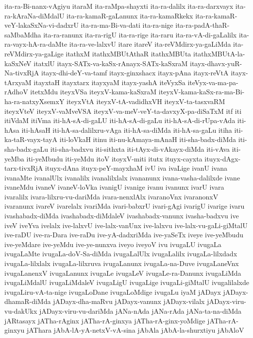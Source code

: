 {ita-ra-Bi-nanx-vAgiyu
itaraM
ita-raMpa-shayxti
ita-ra-dalilx
ita-ra-darxvayx
ita-ra-kAraNa-diMdalU
ita-ra-kamaR-gaLanunx
ita-ra-kamaRkekx
ita-ra-kamaR-veY-lakaSxNa-vi-dadxrU
ita-ra-ma-Bi-va-dati
ita-ra-nige
ita-ra-padA-thaR-saMbaMdha
ita-ra-ranunx
ita-ra-rigU
ita-ra-rige
ita-raru
ita-ra-vA-di-gaLalilx
ita-ra-vayx-hA-ra-daMte
ita-ra-ve-lalxvU
itare
itareV
ita-reVMdirx-ya-gaLiMda
ita-reVMdirx-ya-gaLige
itathxM
itathxMBUtAthaR
itathxMBUta
itathxMBUtA-la-kaSxNeV
itatxlU
itayx-SATx-va-kaSx-rAnayx-SATx-kaSxraM
itayx-dhavx-yuR-Na-tivxRjA
itayx-dhi-deY-va-tamf
itayx-ginxshacx
itayx-pAna
itayx-reVtA
itayx-tArxyaM
itayxtaH
itayxtarx
itayxyaM
itayx-yashA
iteVyxSa
iteVyx-va-ma-pa-rAdhoV
itetxMdu
iteyxVSa
iteyxV-kama-kaSxraM
iteyxV-kama-kaSx-ra-ma-Bi-ha-ra-natxyXsemxY
iteyxVtA
iteyxV-tA-vadidhxVH
iteyxV-ta-tasxvaRM
iteyxVteV
iteyxV-vaMveVSA
iteyxV-va-meV-veY-ta-davxyX-pa-diSaTxM
itf
iti
itiVdaM
itiVma
iti-hA-sA-di-gaLU
iti-hA-sA-di-gaLu
iti-hA-sA-di-rUpa-vAda
iti-hAsa
iti-hAsaH
iti-hA-sa-dalilxru-vAga
iti-hA-sa-diMda
iti-hA-sa-gaLu
itiha
iti-ka-taR-vayx-tayA
iti-loVkaH
itinu
iti-nu-kAmaya-mAnaH
iti-sha-badx-diMda
iti-sha-badx-gaLu
iti-sha-badxvu
iti-sithxta
iti-tAyx-di-vAkayx-diMda
iti-vAva
iti-yeMba
iti-yeMbudu
iti-yeMdu
itoV
itoyxV-miti
itutx
ituyx-cayxta
ituyx-dAgx-tarx-tivxRjA
ituyx-dAna
ituyx-peY-mayxhaM
ivU
iva
ivaLige
ivanU
ivana
ivanaMte
ivanalUlx
ivanalilx
ivanalilxlalx
ivananunx
ivana-vasha-dalilxde
ivane
ivaneMdu
ivaneV
ivaneV-loVka
ivanigU
ivanige
ivanu
ivanunx
ivarU
ivara
ivaralilx
ivara-lilxru-vu-dariMda
ivara-nenxlAlx
ivaranoVnx
ivaranonxV
ivaranunx
ivareV
ivarelalx
ivariMda
ivari-babxrU
ivari-gAgi
ivarigU
ivarige
ivaru
ivashabadx-diMda
ivashabadx-diMdaleV
ivashabadx-vanunx
ivasha-badxvu
ive
iveV
iveYva
ivelalx
ive-lalxvU
ive-lalx-vanUnx
ive-lalxvu
ive-lalx-vu-gaLi-giMtalU
ive-raDU
ive-ra-Dara
ive-raDu
ive-yA-dadxriMda
ive-yaSeTx
iveye
ive-yeMbudu
ive-yeMdare
ive-yeMdu
ive-ye-nunxva
iveyo
iveyoV
ivu
ivugaLU
ivugaLa
ivugaLaMte
ivugaLa-doV-Sa-diMda
ivugaLalUlx
ivugaLalilx
ivugaLa-lilxdadx
ivugaLa-lilxlalx
ivugaLa-lilxruva
ivugaLanunx
ivugaLa-na-Duve
ivugaLaneVnx
ivugaLanenxV
ivugaLanunx
ivugaLe
ivugaLeV
ivugaLe-ra-Danunx
ivugaLiMda
ivugaLiMdalU
ivugaLiMdaleV
ivugaLigU
ivugaLige
ivugaLi-giMtalU
ivugalilalxde
ivugaLiru-vA-ta-nige
ivugaLoDane
ivugaLoMdige
ivugaLu
iyaM
jADayx
jADayx-dhamaR-diMda
jADayx-dha-maRvu
jADayx-vanunx
jADayx-vilalx
jADayx-viru-vu-dakUkx
jADayx-viru-vu-dariMda
jANa-nAda
jANa-rAda
jANa-ta-na-diMda
jARtasayx
jATha-rAginx
jATha-rA-ginxya
jATha-rA-ginx-yoMdige
jATha-rA-ginxyu
jAThara
jAbA-lA-yA-netxV-vA-sina
jAbAla
jAbA-la-shurxtiyu
jAbAloV
}
